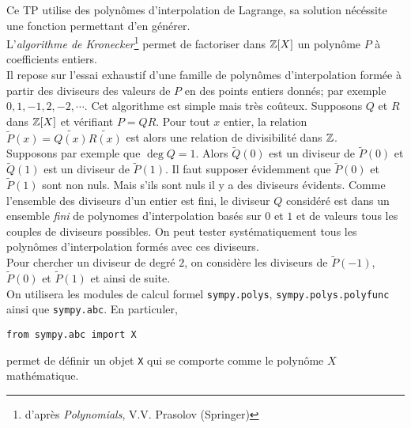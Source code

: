 Ce TP utilise des polynômes d'interpolation de Lagrange, sa solution nécéssite une fonction permettant d'en générer.\\
L'\emph{algorithme de Kronecker}\footnote{d'après \emph{Polynomials}, V.V. Prasolov (Springer)} permet de factoriser dans $\mathbb{Z}[X]$ un polynôme $P$ à coefficients entiers.\\
Il repose sur l'essai exhaustif d'une famille de polynômes d'interpolation formée à partir des diviseurs des valeurs de $P$ en des points entiers donnés; par exemple $0,1,-1,2,-2,\cdots$. Cet algorithme est simple mais très coûteux.\newline
Supposons $Q$ et $R$ dans $\mathbb{Z}[X]$ et vérifiant $P=QR$. Pour tout $x$ entier, la relation $\widetilde{P}(x)=\widetilde{Q(x)}\widetilde{R(x)}$ est alors une relation de divisibilité dans $\mathbb{Z}$.\\
Supposons par exemple que $\deg Q=1$. Alors $\widetilde{Q}(0)$ est un diviseur de $\widetilde{P}(0)$ et $\widetilde{Q}(1)$ est un diviseur de $\widetilde{P}(1)$. Il faut supposer évidemment que $\widetilde{P}(0)$ et $\widetilde{P}(1)$ sont non nuls. Mais s'ils sont nuls il y a des diviseurs évidents. Comme l'ensemble des diviseurs d'un entier est fini, le diviseur $Q$ considéré est dans un ensemble \emph{fini} de polynomes d'interpolation basés sur $0$ et $1$ et de valeurs tous les couples de diviseurs possibles. On peut tester systématiquement tous les polynômes d'interpolation formés avec ces diviseurs.\\
Pour chercher un diviseur de degré $2$, on considère les diviseurs de $\widetilde{P}(-1)$, $\widetilde{P}(0)$ et $\widetilde{P}(1)$ et ainsi de suite.\\
On utilisera les modules de calcul formel \verb|sympy.polys|, \verb|sympy.polys.polyfunc| ainsi que \verb|sympy.abc|. En particuler,
\begin{verbatim}
from sympy.abc import X
\end{verbatim}
permet de définir un objet \verb|X| qui se comporte comme le polynôme $X$ mathématique.
